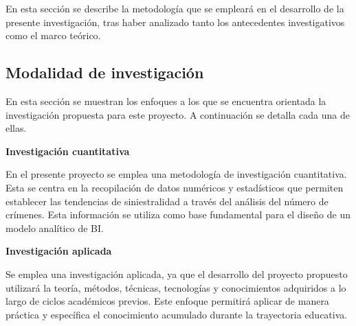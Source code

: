 En esta sección se describe la metodología que se empleará en el desarrollo de la presente investigación,
tras haber analizado tanto los antecedentes investigativos como el marco teórico.

\subsection{Modalidad de investigación}
En esta sección se muestran los enfoques a los que se encuentra orientada la investigación propuesta para este proyecto. A continuación se detalla
cada una de ellas.

\bigbreak
\textbf{Investigación cuantitativa}
\bigbreak

En el presente proyecto se emplea una metodología de investigación cuantitativa. Esta se centra en la recopilación de
datos numéricos y estadísticos que permiten establecer las tendencias de siniestralidad a través del análisis del número
de crímenes. Esta información se utiliza como base fundamental para el diseño de un modelo analítico de BI.

\bigbreak
\textbf{Investigación aplicada}
\bigbreak

Se emplea una investigación aplicada, ya que el desarrollo del proyecto propuesto utilizará la teoría, métodos,
técnicas, tecnologías y conocimientos adquiridos a lo largo de ciclos académicos previos. Este enfoque permitirá
aplicar de manera práctica y específica el conocimiento acumulado durante la trayectoria educativa.



